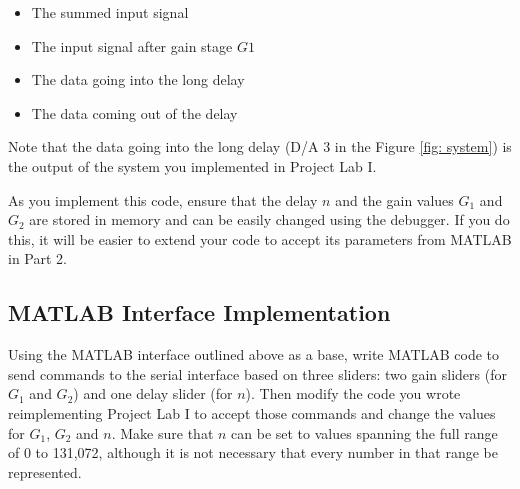 \documentclass[11pt]{handout}
\begin{document}
\begin{itemize}
  \item{The summed input signal}
  \item{The input signal after gain stage $G1$}
  \item{The data going into the long delay}
  \item{The data coming out of the delay}
\end{itemize}

Note that the data going into the long delay (D/A 3 in the Figure
\ref{fig: system}) is the output of the system you implemented in Project
Lab I.

As you implement this code, ensure that the delay $n$ and the gain
values $G_1$ and $G_2$ are stored in memory and can be easily changed
using the debugger. If you do this, it will be easier to extend your
code to accept its parameters from MATLAB in Part 2.

\subsection{MATLAB Interface Implementation}

Using the MATLAB interface outlined above as a base, write MATLAB code to send
commands to the serial interface based on three sliders: two gain sliders
(for $G_1$ and $G_2$) and one delay slider (for $n$). Then modify the code
you wrote reimplementing Project Lab I to accept those commands and change
the values for $G_1$, $G_2$ and $n$. Make sure that $n$ can be set to
values spanning the full range of 0 to 131,072, although it is not necessary
that every number in that range be represented. 
\end{document}
